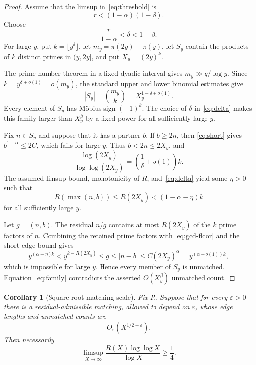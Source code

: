 \documentclass[11pt,a4paper]{amsart}
\newtheorem{corollary}[theorem]{Corollary}
\theoremstyle{definition}
\theoremstyle{remark}
\begin{document}
\begin{proof}
Assume that the limsup in~\eqref{eq:threshold} is
\[
 r<(1-\alpha)(1-\beta).
\]
Choose
\begin{equation}\label{eq:delta}
 \frac{r}{1-\alpha}<\delta<1-\beta.
\end{equation}
For large $y$, put $k=\lfloor y^\delta\rfloor$, let
$m_y=\pi(2y)-\pi(y)$, let $S_y$ contain the products of $k$ distinct primes
in $(y,2y]$, and put $X_y=(2y)^k$.

The prime number theorem in a fixed dyadic interval
\cite{MontgomeryVaughan2007} gives
$m_y\gg y/\log y$.  Since $k=y^{\delta+o(1)}=o(m_y)$, the standard upper and
lower binomial estimates give
\begin{equation}\label{eq:family}
 |S_y|=\binom{m_y}{k}=X_y^{1-\delta+o(1)}.
\end{equation}
Every element of $S_y$ has M\"obius sign $(-1)^k$.  The choice of $\delta$
in~\eqref{eq:delta} makes this family larger than $X_y^\beta$ by a fixed
power for all sufficiently large $y$.

Fix $n\in S_y$ and suppose that it has a partner $b$.  If $b\geq2n$, then
\eqref{eq:short} gives $b^{1-\alpha}\leq2C$, which fails for large $y$.
Thus $b<2n\leq2X_y$, and
\begin{equation}\label{eq:logscale}
 \frac{\log(2X_y)}{\log\log(2X_y)}
 =\left(\frac1\delta+o(1)\right)k.
\end{equation}
The assumed limsup bound, monotonicity of $R$, and~\eqref{eq:delta} yield
some $\eta>0$ such that
\begin{equation}\label{eq:R-bound}
 R(\max(n,b))\leq R(2X_y)<(1-\alpha-\eta)k
\end{equation}
for all sufficiently large $y$.

Let $g=(n,b)$.  The residual $n/g$ contains at most $R(2X_y)$ of the $k$
prime factors of $n$.  Combining the retained prime factors with
\eqref{eq:gcd-floor} and the short-edge bound gives
\begin{equation}\label{eq:key-sandwich}
 y^{(\alpha+\eta)k}
 < y^{k-R(2X_y)}
 \leq g
 \leq |n-b|
 \leq C(2X_y)^\alpha
 =y^{(\alpha+o(1))k},
\end{equation}
which is impossible for large $y$.  Hence every member of $S_y$ is
unmatched.  Equation~\eqref{eq:family} contradicts the asserted
$O(X_y^\beta)$ unmatched count.
\end{proof}

\begin{corollary}[Square-root matching scale]\label{cor:quarter}
Fix $R$.  Suppose that for every $\varepsilon>0$ there is a
residual-admissible matching, allowed to depend on $\varepsilon$, whose edge
lengths and unmatched counts are
\[
 O_\varepsilon(X^{1/2+\varepsilon}).
\]
Then necessarily
\[
 \limsup_{X\to\infty}
 \frac{R(X)\log\log X}{\log X}\geq\frac14.
\]
\end{corollary}
\end{document}
